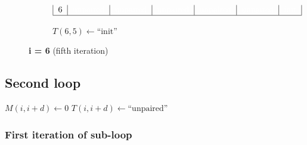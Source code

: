 \begin{figure}[H]
\begin{subfigure}[t]{0.65\textwidth}
\[\begin{tabular}{|c|c|c|c|c|c|c|}
                                    6 & \textcolor{white}{unpaired} & \textcolor{white}{unpaired} & \textcolor{white}{unpaired}
                                    & \textcolor{white}{unpaired}
                                    & \textcolor{white}{unpaired}
                                    & \textcolor{white}{init}
                                    \\ \hline
                        \end{tabular}
        \]
        \caption{$T(6,5) \gets \text{``init''}$ }
    \end{subfigure}
    \caption{\textbf{i = 6} (fifth iteration)}\label{fig:figure25}

\end{figure}

\subsection*{Second loop}
\begin{algorithmic}
            \State $M(i,i+d) \gets 0$
            \State $T(i,i+d) \gets \text{``unpaired''}$
        \EndFor
    \EndFor
\end{algorithmic}

\subsubsection*{First iteration of sub-loop}

